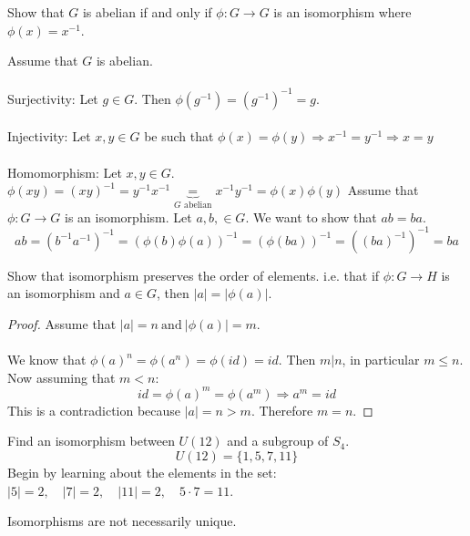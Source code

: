 \documentclass[class=scrartcl, crop=false]{standalone}
\begin{document}
\begin{exercise}
  Show that $G$ is abelian if and only if $\phi: G \to G$ is an isomorphism where $\phi(x) = x^{-1}$.
  \begin{itemize}
    \ii[$(\Rightarrow)$ ]
    Assume that $G$ is abelian.
    \\\\
    Surjectivity: Let $g \in G$. Then $\phi(g^{-1}) = (g^{-1})^{-1} = g$.
    \\\\
    Injectivity: Let $x, y \in G$ be such that $\phi(x) = \phi(y) \Rightarrow x^{-1} = y^{-1} \Rightarrow x = y$
    \\\\
    Homomorphism: Let $x,y \in G$. $\phi(xy) = (xy)^{-1} = y^{-1}x^{-1} \underbrace{=}_{G \text{ abelian}} x^{-1}y^{-1} = \phi(x)\phi(y)$
    \ii[$(\Leftarrow)$ ]
    Assume that $\phi:G \to G$ is an isomorphism. Let $a,b, \in G$. We want to show that $ab = ba$.
    \[
      ab = (b^{-1}a^{-1})^{-1} = (\phi(b)\phi(a))^{-1} = (\phi(ba))^{-1} = ((ba)^{-1})^{-1} = ba
    \]
  \end{itemize}
\end{exercise}

\begin{exercise}
  Show that isomorphism preserves the order of elements. i.e. that if $\phi: G \to H$ is an isomorphism and $a \in G$, then $|a| = |\phi(a)|$.
  \begin{proof}
    Assume that $|a| = n \ \text{and} \ |\phi(a)| = m$.
    \\\\
    We know that $\phi(a)^n = \phi(a^n) = \phi(id) = id$. Then $m | n$, in particular $m \leq n$. Now assuming that $m < n$:
    \[
      id = \phi(a)^m = \phi(a^m) \Rightarrow a^m = id 
    \]
    This is a contradiction because $|a| = n > m$. Therefore $m = n$.
  \end{proof}
\end{exercise}

\begin{exercise}
  Find an isomorphism between $U(12)$ and a subgroup of $S_4$.
  \[
    U(12) = \{1, 5, 7, 11\}
  \]
  Begin by learning about the elements in the set: $|5| = 2, \quad |7| = 2, \quad |11| = 2,\quad 5 \cdot 7 = 11$.
  \begin{remark}
    Isomorphisms are not necessarily unique.
  \end{remark}
\end{exercise}
\end{document}
